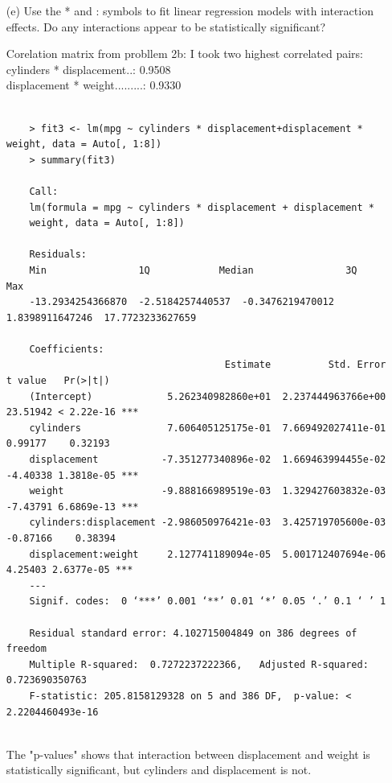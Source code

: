 \documentclass{article}
\begin{document}
\begin{itemize}
\newpage

\item[(e)] Use the * and : symbols to fit linear regression models with interaction effects. Do any interactions appear to be statistically significant?



Corelation matrix from probllem 2b:  I took two highest correlated pairs:
\\cylinders      * displacement..: 0.9508
\\displacement *  weight.........:  0.9330 

\begin{program}
	\begin{verbatim}
	
	> fit3 <- lm(mpg ~ cylinders * displacement+displacement * weight, data = Auto[, 1:8])
	> summary(fit3)
	
	Call:
	lm(formula = mpg ~ cylinders * displacement + displacement * 
	weight, data = Auto[, 1:8])
	
	Residuals:
	Min                1Q            Median                3Q               Max 
	-13.2934254366870  -2.5184257440537  -0.3476219470012   1.8398911647246  17.7723233627659 
	
	Coefficients:
	                                  Estimate          Std. Error t value   Pr(>|t|)    
	(Intercept)             5.262340982860e+01  2.237444963766e+00 23.51942 < 2.22e-16 ***
	cylinders               7.606405125175e-01  7.669492027411e-01  0.99177    0.32193    
	displacement           -7.351277340896e-02  1.669463994455e-02 -4.40338 1.3818e-05 ***
	weight                 -9.888166989519e-03  1.329427603832e-03 -7.43791 6.6869e-13 ***
	cylinders:displacement -2.986050976421e-03  3.425719705600e-03 -0.87166    0.38394    
	displacement:weight     2.127741189094e-05  5.001712407694e-06  4.25403 2.6377e-05 ***
	---
	Signif. codes:  0 ‘***’ 0.001 ‘**’ 0.01 ‘*’ 0.05 ‘.’ 0.1 ‘ ’ 1
	
	Residual standard error: 4.102715004849 on 386 degrees of freedom
	Multiple R-squared:  0.7272237222366,	Adjusted R-squared:  0.723690350763 
	F-statistic: 205.8158129328 on 5 and 386 DF,  p-value: < 2.2204460493e-16
	
	\end{verbatim}
\end{program}

The "p-values" shows that interaction between displacement and weight is statistically significant, but
cylinders and displacement is not.




\end{itemize}
\end{document}
